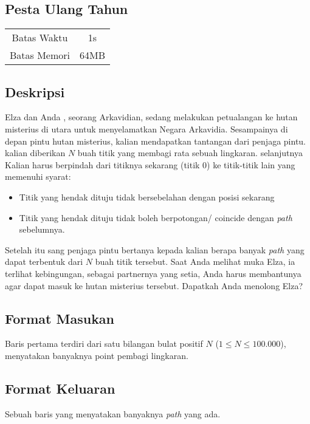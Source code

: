\documentclass{article}
\begin{document}
\begin{center}
    \section*{Pesta Ulang Tahun} %

    \begin{tabular}{ | c c | }
        \hline
        Batas Waktu  & 1s \\    %
        Batas Memori & 64MB \\  %
        \hline
    \end{tabular}
\end{center}

\subsection*{Deskripsi}

Elza dan Anda , seorang Arkavidian, sedang melakukan petualangan ke hutan misterius di utara untuk menyelamatkan Negara Arkavidia.
Sesampainya di depan pintu hutan misterius, kalian mendapatkan tantangan dari penjaga pintu.
kalian diberikan $N$ buah titik yang membagi rata sebuah lingkaran. selanjutnya Kalian harus berpindah dari titiknya
sekarang (titik 0) ke titik-titik lain yang memenuhi syarat:

\begin{itemize}
    \setlength\itemsep{0pt}
    \item Titik yang hendak dituju tidak bersebelahan dengan posisi sekarang
    \item Titik yang hendak dituju tidak boleh berpotongan/ coincide dengan \textit{path} sebelumnya.
\end{itemize}

Setelah itu sang penjaga pintu bertanya kepada kalian berapa banyak \textit{path} yang dapat terbentuk dari $N$ buah titik tersebut.
Saat Anda melihat muka Elza, ia terlihat kebingungan, sebagai partnernya yang setia, Anda harus membantunya 
agar dapat masuk ke hutan misterius tersebut. Dapatkah Anda menolong Elza?

\subsection*{Format Masukan}
Baris pertama terdiri dari satu bilangan bulat positif $N$ ($1 \leq N \leq 100.000$), menyatakan banyaknya point pembagi lingkaran.

\subsection*{Format Keluaran}
Sebuah baris yang menyatakan banyaknya \textit{path} yang ada.
\\
\end{document}
